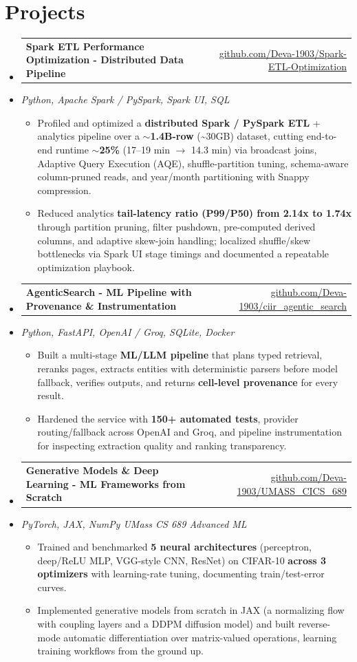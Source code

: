 \documentclass[letterpaper,10pt]{article}
\makeatletter
\newcommand{\resumeItem}[1]{
  \item\small{#1\vspace{-1pt}}
}
\newcommand{\resumeProjectHeading}[2]{
    \item
    \begin{tabular*}{0.985\textwidth}[t]{l@{\extracolsep{\fill}}r}
      \small\textbf{#1} & \small #2 \\
    \end{tabular*}\vspace{-5pt}
}
\newcommand{\resumeProjectSubheading}[1]{
  \vspace{-2pt}\item[] {\small\textcolor{ResumeSlate}{\emph{#1}}}\vspace{-3pt}
}
\newcommand{\resumeSubHeadingListStart}{\begin{itemize}[leftmargin=0.0in, label={}, itemsep=2pt, topsep=2pt]}
\newcommand{\resumeSubHeadingListEnd}{\end{itemize}}
\newcommand{\resumeItemListStart}{\begin{itemize}[leftmargin=0.18in, itemsep=2pt, topsep=1pt]}
\newcommand{\resumeItemListEnd}{\end{itemize}\vspace{-4pt}}
\makeatother
\begin{document}
\section{Projects}
\resumeSubHeadingListStart
  \resumeProjectHeading
    {Spark ETL Performance Optimization - Distributed Data Pipeline}
    {\href{https://github.com/Deva-1903/Spark-ETL-Optimization}{github.com/Deva-1903/Spark-ETL-Optimization}}
  \resumeProjectSubheading{Python, Apache Spark / PySpark, Spark UI, SQL}
    \resumeItemListStart
      \resumeItem{Profiled and optimized a \textbf{distributed Spark / PySpark ETL} + analytics pipeline over a \textbf{$\sim$1.4B-row} (\textasciitilde30GB) dataset, cutting end-to-end runtime \textbf{$\sim$25\%} (17--19 min $\to$ 14.3 min) via broadcast joins, Adaptive Query Execution (AQE), shuffle-partition tuning, schema-aware column-pruned reads, and year/month partitioning with Snappy compression.}
      \resumeItem{Reduced analytics \textbf{tail-latency ratio (P99/P50) from 2.14x to 1.74x} through partition pruning, filter pushdown, pre-computed derived columns, and adaptive skew-join handling; localized shuffle/skew bottlenecks via Spark UI stage timings and documented a repeatable optimization playbook.}
    \resumeItemListEnd
  \resumeProjectHeading
    {AgenticSearch - ML Pipeline with Provenance \& Instrumentation}
    {\href{https://github.com/Deva-1903/ciir_agentic_search}{github.com/Deva-1903/ciir\_agentic\_search}}
  \resumeProjectSubheading{Python, FastAPI, OpenAI / Groq, SQLite, Docker}
    \resumeItemListStart
      \resumeItem{Built a multi-stage \textbf{ML/LLM pipeline} that plans typed retrieval, reranks pages, extracts entities with deterministic parsers before model fallback, verifies outputs, and returns \textbf{cell-level provenance} for every result.}
      \resumeItem{Hardened the service with \textbf{150+ automated tests}, provider routing/fallback across OpenAI and Groq, and pipeline instrumentation for inspecting extraction quality and ranking transparency.}
    \resumeItemListEnd
  \resumeProjectHeading
    {Generative Models \& Deep Learning - ML Frameworks from Scratch}
    {\href{https://github.com/Deva-1903/UMASS_CICS_689}{github.com/Deva-1903/UMASS\_CICS\_689}}
  \resumeProjectSubheading{PyTorch, JAX, NumPy \enspace\textbar\enspace UMass CS 689 Advanced ML}
    \resumeItemListStart
      \resumeItem{Trained and benchmarked \textbf{5 neural architectures} (perceptron, deep/ReLU MLP, VGG-style CNN, ResNet) on CIFAR-10 \textbf{across 3 optimizers} with learning-rate tuning, documenting train/test-error curves.}
      \resumeItem{Implemented generative models from scratch in JAX (a normalizing flow with coupling layers and a DDPM diffusion model) and built reverse-mode automatic differentiation over matrix-valued operations, learning training workflows from the ground up.}
    \resumeItemListEnd
\resumeSubHeadingListEnd
\vspace{-4pt}
\end{document}
